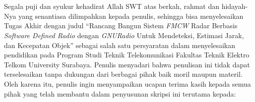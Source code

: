 \chapter*{\kataPengantar}

Segala puji dan syukur kehadirat Allah SWT atas berkah, rahmat dan hidayah-Nya yang senantiasa dilimpahkan kepada penulis, sehingga bisa menyelesaikan Tugas Akhir dengan judul “Rancang Bangun Sistem \textit{FMCW} Radar Berbasis \textit{Software Defined Radio} dengan \textit{GNURadio} Untuk Mendeteksi, Estimasi Jarak, dan Kecepatan Objek” sebagai salah satu persyaratan dalam menyelesaikan pendidikan pada Program Studi Teknik Telekomunikasi Fakultas Teknik Elektro Telkom University Surabaya.
Penulis menyadari bahwa penulisan ini tidak dapat terselesaikan tanpa dukungan dari berbagai pihak baik moril maupun materil. Oleh karena itu, penulis ingin menyampaikan ucapan terima kasih kepada semua pihak yang telah membantu dalam penyusunan skripsi ini terutama kepada:
